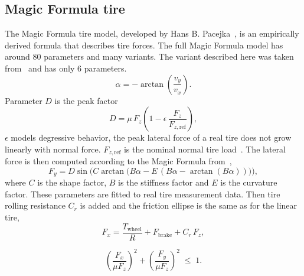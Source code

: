 \subsection{Magic Formula tire}
The Magic Formula tire model, developed by Hans B. Pacejka~\cite{pacejka}, is an empirically derived formula that describes tire forces. The full Magic Formula model has around 80 parameters and many variants. The variant described here was taken from~\cite{2026ClassProject} and has only 6 parameters.\label{pacejka}
\begin{equation}
    \alpha = -\arctan\!\left(\frac{v_y}{v_x}\right).
    \label{eq:pac_slip}
\end{equation}
Parameter $D$ is the peak factor
\begin{equation}
    D = \mu\, F_z \left(1 - \epsilon\, \frac{F_z}{F_{z,\text{ref}}}\right),
    \label{eq:pac_peak}
\end{equation}
$\epsilon$ models degressive behavior, the peak lateral force of a real tire does not grow linearly with normal force. $F_{z,\text{ref}}$ is the nominal normal tire load~\cite{2026ClassProject}. The lateral force is then computed according to the Magic Formula from~\cite{pacejka},
\begin{equation}
    F_y = D \sin\!\Big( C \arctan\!\big( B\alpha - E\,(B\alpha - \arctan(B\alpha)) \big) \Big),
    \label{eq:pac_fy}
\end{equation}
where $C$ is the shape factor, $B$ is the stiffness factor and $E$ is the curvature factor. These parameters are fitted to real tire measurement data.
Then tire rolling resistance $C_r$ is added and the friction ellipse is the same as for the linear tire,
\begin{equation}
    F_x = \frac{T_\text{wheel}}{R} + F_\text{brake} + C_r\, F_z,
    \label{eq:pac_fx}
\end{equation}

\begin{equation}
    \left(\frac{F_x}{\mu F_z}\right)^{\!2} + \left(\frac{F_y}{\mu F_z}\right)^{\!2} \;\leq\; 1.
    \label{eq:pac_friction_circle}
\end{equation}

